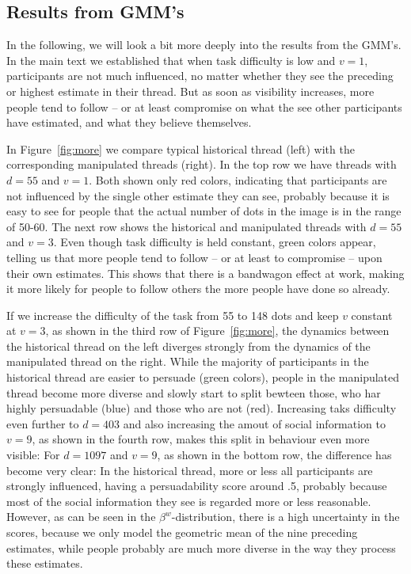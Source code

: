 \documentclass[9pt,a4paper,twocolumn,lineno]{article}
\begin{document}
\subsection*{Results from GMM's}
In the following, we will look a bit more deeply into the results from the GMM's. In the main text we established that when task difficulty is low and $v=1$, participants are not much influenced, no matter whether they see the preceding or highest estimate in their thread. But as soon as visibility increases, more people tend to follow – or at least compromise on what the see other participants have estimated, and what they believe themselves. 

In Figure~\ref{fig:more} we compare typical historical thread (left) with the corresponding manipulated threads (right). In the top row we have threads with $d=55$ and $v=1$. Both shown only red colors, indicating that participants are not influenced by the single other estimate they can see, probably because it is easy to see for people that the actual number of dots in the image is in the range of 50-60. The next row shows the historical and manipulated threads with $d=55$ and $v=3$. Even though task difficulty is held constant, green colors appear, telling us that more people tend to follow – or at least to compromise – upon their own estimates. This shows that there is a bandwagon effect at work, making it more likely for people to follow others the more people have done so already. 

If we increase the difficulty of the task from 55 to 148 dots and keep $v$ constant at $v=3$, as shown in the third row of Figure~\ref{fig:more}, the dynamics between the historical thread on the left diverges strongly from the dynamics of the manipulated thread on the right. While the majority of participants in the historical thread are easier to persuade (green colors), people in the manipulated thread become more diverse and slowly start to split bewteen those, who har highly persuadable (blue) and those who are not (red). Increasing taks difficulty even further to $d=403$ and also increasing the amout of social information to $v=9$, as shown in the fourth row, makes this split in behaviour even more visible: For $d=1097$ and $v=9$, as shown in the bottom row, the difference has become very clear: In the historical thread, more or less all participants are strongly influenced, having a persuadability score around .5, probably because most of the social information they see is regarded more or less reasonable. However, as can be seen in the $\beta^w$-distribution, there is a high uncertainty in the scores, because we only model the geometric mean of the nine preceding estimates, while people probably are much more diverse in the way they process these estimates. 
\end{document}
